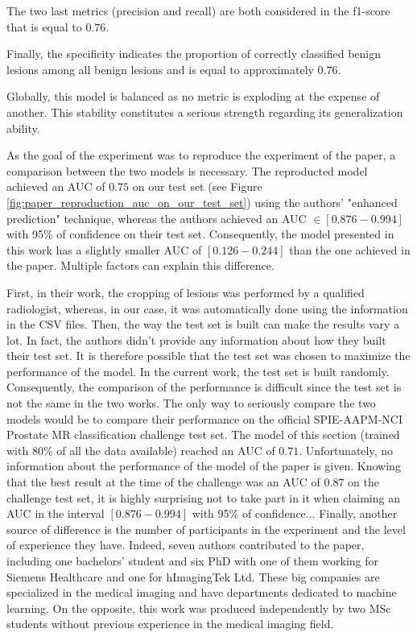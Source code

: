 The two last metrics (precision and recall) are both considered in the f1-score that is equal to $0.76$.

Finally, the specificity indicates the proportion of correctly classified benign lesions among all benign lesions and is equal to approximately $0.76$.

Globally, this model is balanced as no metric is exploding at the expense of another. This stability constitutes a serious strength regarding its generalization ability.

As the goal of the experiment was to reproduce the experiment of the paper, a comparison between the two models is necessary. The reproducted model achieved an AUC of $0.75$ on our test set (see Figure \ref{fig:paper_reproduction_auc_on_our_test_set}) using the authors' "enhanced prediction" technique, whereas the authors achieved an AUC $\in [0.876-0.994]$ with 95\% of confidence on their test set. Consequently, the model presented in this work has a slightly smaller AUC of $[0.126-0.244]$ than the one achieved in the paper. Multiple factors can explain this difference. 

First, in their work, the cropping of lesions was performed by a qualified radiologist, whereas, in our case, it was automatically done using the information in the CSV files. Then, the way the test set is built can make the results vary a lot. In fact, the authors didn't provide any information about how they built their test set. It is therefore possible that the test set was chosen to maximize the performance of the model. In the current work, the test set is built randomly. Consequently, the comparison of the performance is difficult since the test set is not the same in the two works. The only way to seriously compare the two models would be to compare their performance on the official SPIE-AAPM-NCI Prostate MR classification challenge test set. The model of this section (trained with 80\% of all the data available) reached an AUC of $0.71$. Unfortunately, no information about the performance of the model of the paper is given. Knowing that the best result at the time of the challenge was an AUC of $0.87$ on the challenge test set, it is highly surprising not to take part in it when claiming an AUC in the interval $[0.876-0.994]$ with 95\% of confidence... Finally, another source of difference is the number of participants in the experiment and the level of experience they have. Indeed, seven authors contributed to the paper, including one bachelors' student and six PhD with one of them working for Siemens Healthcare and one for hImagingTek Ltd. These big companies are specialized in the medical imaging and have departments dedicated to machine learning. On the opposite, this work was produced independently by two MSc students without previous experience in the medical imaging field. 

